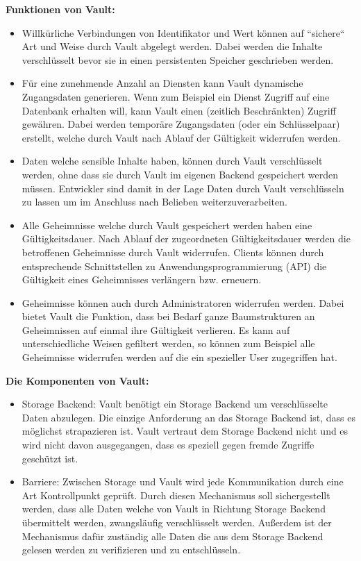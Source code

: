 \documentclass[
a4paper,   
titlepage,  
halfparskip,
12pt        
]{scrartcl}
\begin{document}
\begin{onehalfspacing}
\textbf{Funktionen von Vault:}
\begin{itemize}
  \item Willkürliche Verbindungen von Identifikator und Wert können auf ``sichere`` Art und Weise durch Vault abgelegt werden. Dabei werden die Inhalte verschlüsselt bevor sie in einen persistenten Speicher geschrieben werden.
  \item Für eine zunehmende Anzahl an Diensten kann Vault dynamische Zugangsdaten generieren. Wenn zum Beispiel ein Dienst Zugriff auf eine Datenbank erhalten will, kann Vault einen (zeitlich Beschränkten) Zugriff gewähren. Dabei werden temporäre Zugangsdaten (oder ein Schlüsselpaar) erstellt, welche durch Vault nach Ablauf der Gültigkeit widerrufen werden.
  \item Daten welche sensible Inhalte haben, können durch Vault verschlüsselt werden, ohne dass sie durch Vault im eigenen Backend gespeichert werden müssen. Entwickler sind damit in der Lage Daten durch Vault verschlüsseln zu lassen um im Anschluss nach Belieben weiterzuverarbeiten.
  \item Alle Geheimnisse welche durch Vault gespeichert werden haben eine Gültigkeitsdauer. Nach Ablauf der zugeordneten Gültigkeitsdauer werden die betroffenen Geheimnisse durch Vault widerrufen. Clients können durch entsprechende Schnittstellen zu Anwendungsprogrammierung (API) die Gültigkeit eines Geheimnisses verlängern bzw. erneuern.
  \item Geheimnisse können auch durch Administratoren widerrufen werden. Dabei bietet Vault die Funktion, dass bei Bedarf ganze Baumstrukturen an Geheimnissen auf einmal ihre Gültigkeit verlieren. Es kann auf unterschiedliche Weisen gefiltert werden, so können zum Beispiel alle Geheimnisse widerrufen werden auf die ein spezieller User zugegriffen hat.
\end{itemize}
\textbf{Die Komponenten von Vault:}
\begin{itemize}
  \item Storage Backend: Vault benötigt ein Storage Backend um verschlüsselte Daten abzulegen. Die einzige Anforderung an das Storage Backend ist, dass es möglichst strapazieren ist. Vault vertraut dem Storage Backend nicht und es wird nicht davon ausgegangen, dass es speziell gegen fremde Zugriffe geschützt ist. 
  \item Barriere: Zwischen Storage und Vault wird jede Kommunikation durch eine Art Kontrollpunkt geprüft. Durch diesen Mechanismus soll sichergestellt werden, dass alle Daten welche von Vault in Richtung Storage Backend übermittelt werden, zwangsläufig verschlüsselt werden. Außerdem ist der Mechanismus dafür zuständig alle Daten die aus dem Storage Backend gelesen werden zu verifizieren und zu entschlüsseln. 

\end{itemize}
\end{onehalfspacing}
\end{document}
